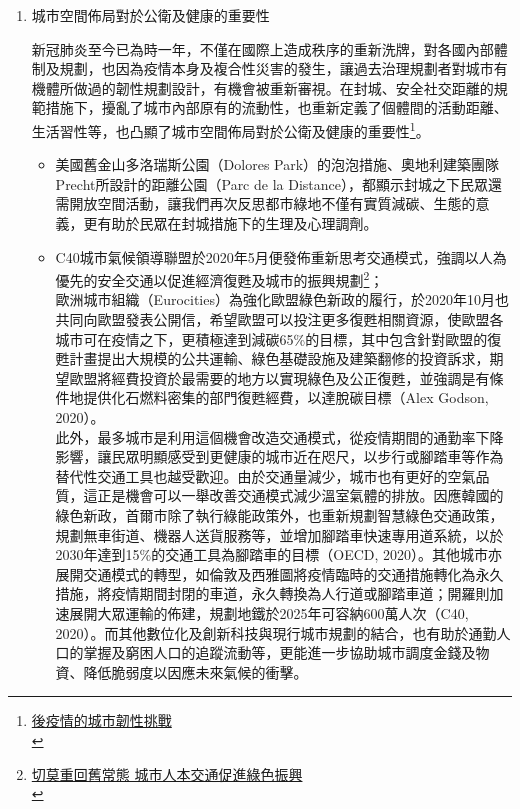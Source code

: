 \documentclass[a4paper,12pt]{article}
\begin{document}
\begin{enumerate}
\item 城市空間佈局對於公衛及健康的重要性
\label{sec:org367e27b}

新冠肺炎至今已為時一年，不僅在國際上造成秩序的重新洗牌，對各國內部體制及規劃，也因為疫情本身及複合性災害的發生，讓過去治理規劃者對城市有機體所做過的韌性規劃設計，有機會被重新審視。在封城、安全社交距離的規範措施下，擾亂了城市內部原有的流動性，也重新定義了個體間的活動距離、生活習性等，也凸顯了城市空間佈局對於公衛及健康的重要性\footnote{\href{https://rsprc.ntu.edu.tw/zh-tw/m01-3/understand-risk-society/1550-1100222-covid.html}{ 後疫情的城市韌性挑戰 }\\}。\\
\begin{itemize}
\item 美國舊金山多洛瑞斯公園（Dolores Park）的泡泡措施、奧地利建築團隊Precht所設計的距離公園（Parc de la Distance），都顯示封城之下民眾還需開放空間活動，讓我們再次反思都市綠地不僅有實質減碳、生態的意義，更有助於民眾在封城措施下的生理及心理調劑。\\
\item C40城市氣候領導聯盟於2020年5月便發佈重新思考交通模式，強調以人為優先的安全交通以促進經濟復甦及城市的振興規劃\footnote{\href{https://rsprc.ntu.edu.tw/zh-tw/m01-3/en-trans/1430-1090525-green-recovery2.html}{ 切莫重回舊常態 城市人本交通促進綠色振興 }\\\label{org1cf4786}}；\\
歐洲城市組織（Eurocities）為強化歐盟綠色新政的履行，於2020年10月也共同向歐盟發表公開信，希望歐盟可以投注更多復甦相關資源，使歐盟各城市可在疫情之下，更積極達到減碳65\%的目標，其中包含針對歐盟的復甦計畫提出大規模的公共運輸、綠色基礎設施及建築翻修的投資訴求，期望歐盟將經費投資於最需要的地方以實現綠色及公正復甦，並強調是有條件地提供化石燃料密集的部門復甦經費，以達脫碳目標（Alex Godson, 2020）。\\

此外，最多城市是利用這個機會改造交通模式，從疫情期間的通勤率下降影響，讓民眾明顯感受到更健康的城市近在咫尺，以步行或腳踏車等作為替代性交通工具也越受歡迎。由於交通量減少，城市也有更好的空氣品質，這正是機會可以一舉改善交通模式減少溫室氣體的排放。因應韓國的綠色新政，首爾市除了執行綠能政策外，也重新規劃智慧綠色交通政策，規劃無車街道、機器人送貨服務等，並增加腳踏車快速專用道系統，以於2030年達到15\%的交通工具為腳踏車的目標（OECD, 2020）。其他城市亦展開交通模式的轉型，如倫敦及西雅圖將疫情臨時的交通措施轉化為永久措施，將疫情期間封閉的車道，永久轉換為人行道或腳踏車道；開羅則加速展開大眾運輸的佈建，規劃地鐵於2025年可容納600萬人次（C40, 2020）。而其他數位化及創新科技與現行城市規劃的結合，也有助於通勤人口的掌握及窮困人口的追蹤流動等，更能進一步協助城市調度金錢及物資、降低脆弱度以因應未來氣候的衝擊。\\


\end{itemize}
\end{enumerate}
\end{document}
